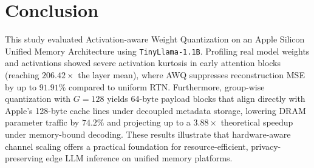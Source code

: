 \documentclass[runningheads,oribibl]{llncs}
\begin{document}
\section{Conclusion}
This study evaluated Activation-aware Weight Quantization on an Apple Silicon Unified Memory Architecture using \texttt{TinyLlama-1.1B}. Profiling real model weights and activations showed severe activation kurtosis in early attention blocks (reaching $206.42\times$ the layer mean), where AWQ suppresses reconstruction MSE by up to $91.91\%$ compared to uniform RTN. Furthermore, group-wise quantization with $G=128$ yields 64-byte payload blocks that align directly with Apple's 128-byte cache lines under decoupled metadata storage, lowering DRAM parameter traffic by $74.2\%$ and projecting up to a $3.88\times$ theoretical speedup under memory-bound decoding. These results illustrate that hardware-aware channel scaling offers a practical foundation for resource-efficient, privacy-preserving edge LLM inference on unified memory platforms.
\end{document}
